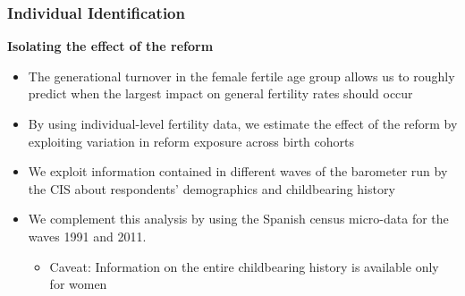 \documentclass[aspectratio=169]{beamer}
\begin{document}
\begin{frame}
\frametitle{Individual Identification}
\textbf{Isolating the effect of the reform}
\begin{itemize}
    \item The generational turnover in the female fertile age group allows us to roughly predict when the largest impact on general fertility rates should occur
 
\item By using individual-level fertility data, we estimate the effect of the reform by exploiting variation in reform exposure across birth cohorts

\end{itemize}
\medskip
\vspace{1cm}
\begin{itemize}
    \item We exploit information contained in different waves of the barometer run by the CIS about respondents' demographics and childbearing history

    \medskip
 \item We complement this analysis by using the Spanish census micro-data for the waves 1991 and 2011.
    \medskip
    \begin{itemize}
        \item Caveat: Information on the entire childbearing history is available only for women
    \end{itemize}
    \end{itemize}
\end{frame}
\end{document}
